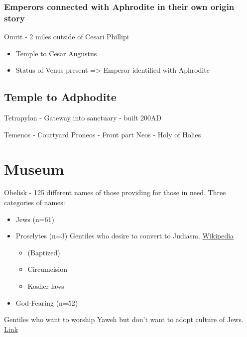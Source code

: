 \documentclass[
]{book}
\providecommand{\tightlist}{%
  \setlength{\itemsep}{0pt}\setlength{\parskip}{0pt}}
\begin{document}
\hypertarget{emperors-connected-with-aphrodite-in-their-own-origin-story}{%
\subsection{Emperors connected with Aphrodite in their own origin story}\label{emperors-connected-with-aphrodite-in-their-own-origin-story}}

Omrit - 2 miles outside of Cesari Phillipi

\begin{itemize}
\tightlist
\item
  Temple to Cesar Augustus
\item
  Status of Venus present
  =\textgreater{} Emperor identified with Aphrodite
\end{itemize}

\hypertarget{temple-to-adphodite}{%
\section{Temple to Adphodite}\label{temple-to-adphodite}}

Tetrapylon - Gateway into sanctuary - built 200AD

Temenos - Courtyard
Proneos - Front part
Neos - Holy of Holies

\hypertarget{museum}{%
\chapter{Museum}\label{museum}}

Obelisk - 125 different names of those providing for those in need.
Three categories of names:

\begin{itemize}
\item
  Jews (n=61)
\item
  Proselytes (n=3) Gentiles who desire to convert to Judiasm. \href{https://en.wikipedia.org/wiki/Proselyte}{Wikipedia}

  \begin{itemize}
  \tightlist
  \item
    (Baptized)
  \item
    Circumcision
  \item
    Kosher laws
  \end{itemize}
\item
  God-Fearing (n=52)
\end{itemize}

Gentiles who want to worship Yaweh but don't want to adopt culture of Jews. \href{https://www.biblestudymagazine.com/bible-study-magazine-blog/2016/6/3/who-were-the-god-fearers}{Link}
\end{document}
